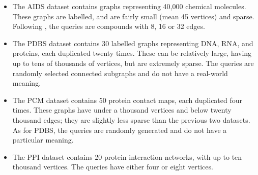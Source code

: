 \documentclass[twoside,11pt]{article}
\newcommand{\citep}[1]{\cite{#1}}
\begin{document}
\begin{itemize}
    \item The AIDS dataset contains graphs representing 40,000 chemical molecules. These graphs are
        labelled, and are fairly small (mean 45 vertices) and sparse. Following
        \citeauthor{o:10.1371/journal.pone.0076911}, the queries are compounds with 8, 16 or 32
        edges.
    \item The PDBS dataset \citep{o:HeLCBBSKMR02} contains 30 labelled graphs representing DNA, RNA,
        and proteins, each duplicated twenty times. These
        can be relatively large, having up to tens of thousands of vertices, but are extremely
        sparse. The queries are randomly selected connected subgraphs and do not have a real-world
        meaning.
    \item The PCM dataset \citep{o:doi:10.1093/bioinformatics/btr163} contains 50 protein contact
        maps, each duplicated four times. These graphs have under a thousand vertices and below
        twenty thousand edges; they are slightly less sparse than the previous two datasets. As for
        PDBS, the queries are randomly generated and do not have a particular meaning.
    \item The PPI dataset contains 20 protein interaction networks, with up to ten thousand
        vertices. The queries have either four or eight vertices.
\end{itemize}
\end{document}
